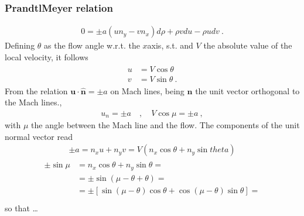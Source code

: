 \documentclass[letterpaper,10pt,english]{jupyterBook}
\begin{document}
\subsubsection*{Prandtl\sphinxhyphen{}Meyer relation}
\begin{equation*}
\begin{split}
  0 = \pm a ( u n_y - v n_x ) d \rho + \rho v d u - \rho u d v \ .
\end{split}
\end{equation*}
\sphinxAtStartPar
Defining \(\theta\) as the flow angle w.r.t. the \(x\)\sphinxhyphen{}axis, s.t. and \(V\) the absolute value of the local velocity, it follows
\begin{equation*}
\begin{split}\begin{aligned}
  u & = V \cos \theta \\
  v & = V \sin \theta \ .
\end{aligned}\end{split}
\end{equation*}
\sphinxAtStartPar
From the relation \(\mathbf{u} \cdot \hat{\mathbf{n}} = \pm a\) on Mach lines, being \(\hat{\mathbf{n}}\) the unit vector orthogonal to the Mach lines.,
\begin{equation*}
\begin{split}u_n = \pm a \quad , \quad V \cos \mu = \pm a \ ,\end{split}
\end{equation*}
\sphinxAtStartPar
with \(\mu\) the angle between the Mach line and the flow. The components of the unit normal vector read
\begin{equation*}
\begin{split}\pm a = n_x u + n_y v = V \left( n_x \cos \theta + n_y \sin theta \right)\end{split}
\end{equation*}\begin{equation*}
\begin{split}\begin{aligned}
  \pm \sin \mu 
  & = n_x \cos \theta + n_y \sin \theta = \\
  & = \pm \sin( \mu - \theta + \theta ) = \\
  & = \pm \left[ \sin ( \mu - \theta ) \cos \theta + \cos ( \mu - \theta ) \sin \theta \right] = \\
\end{aligned}\end{split}
\end{equation*}
\sphinxAtStartPar
so that …
\end{document}
